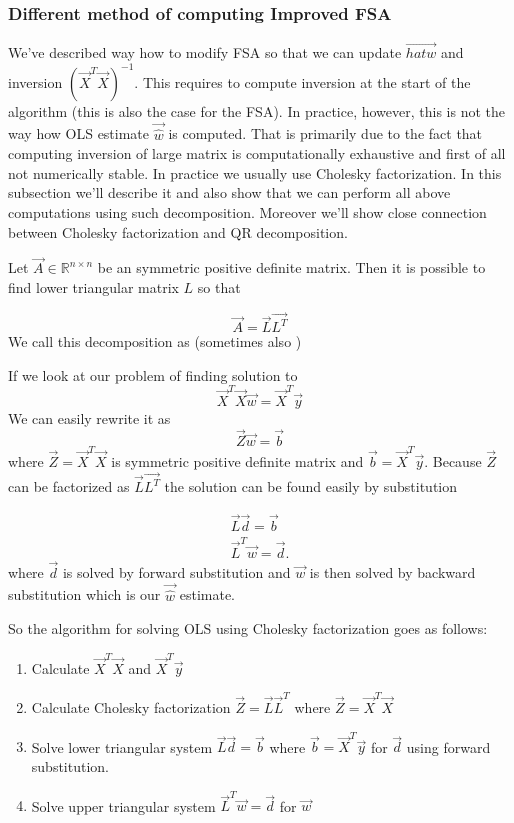 \subsubsection{Different method of computing Improved FSA}
We've described way how to modify FSA so that we can update $\vec{hat{w}}$ and inversion $(\vec{X}^T \vec{X})^{-1}$. This requires to compute inversion at the start of the algorithm (this is also the case for the FSA). In practice, however, this is not the way how OLS estimate $\vec{\hat{w}}$ is computed. That is primarily due to the fact that computing inversion of large matrix is computationally exhaustive and first of all not numerically stable. In practice we usually use Cholesky factorization. In this subsection we'll describe it and also show that we can perform all above computations using such decomposition. Moreover we'll show close connection between Cholesky factorization and QR decomposition.

\begin{definition}
	Let $\vec{A} \in \mathbb{R}^{n \times n}$ be an symmetric positive definite matrix. Then it is possible to find lower triangular matrix $L$ so that 

	\begin{equation}
		\vec{A} = \vec{L}\vec{L^T}
	\end{equation}
	We call this decomposition as  (sometimes also  )
\end{definition}
	
If we look at our problem of finding solution to 
\begin{equation}
	\vec{X}^T\vec{X}\vec{w} = \vec{X}^T\vec{y}
\end{equation}
We can easily rewrite it as 
\begin{equation}
	\vec{Z}\vec{w} = \vec{b}
\end{equation}
where $\vec{Z} = \vec{X}^T\vec{X}$ is symmetric positive definite matrix and $\vec{b} = \vec{X}^T\vec{y} $. Because $\vec{Z}$ can be factorized as $\vec{L}\vec{L^T}$ the solution can be found easily by substitution

\begin{align}
	\vec{L}\vec{d} = \vec{b} \\
	\vec{L}^T\vec{w} = \vec{d}.
\end{align}
where $\vec{d}$ is solved by forward substitution and $\vec{w}$ is then solved by backward substitution which is our $\vec{\hat{w}}$ estimate.

So the algorithm for solving OLS using Cholesky factorization goes as follows:
\begin{enumerate}
  \item Calculate $\vec{X}^T\vec{X}$ and   $\vec{X}^T\vec{y}$ 
  \item Calculate Cholesky factorization $\vec{Z} = \vec{L}\vec{L}^T$ where $\vec{Z} = \vec{X}^T\vec{X}$
  \item Solve lower triangular system $\vec{L}\vec{d} = \vec{b}$  where $ \vec{b} = \vec{X}^T\vec{y}$  for $\vec{d}$ using forward substitution.
  \item Solve upper triangular system $	\vec{L}^T\vec{w} = \vec{d}$ for $\vec{w}$
\end{enumerate}

